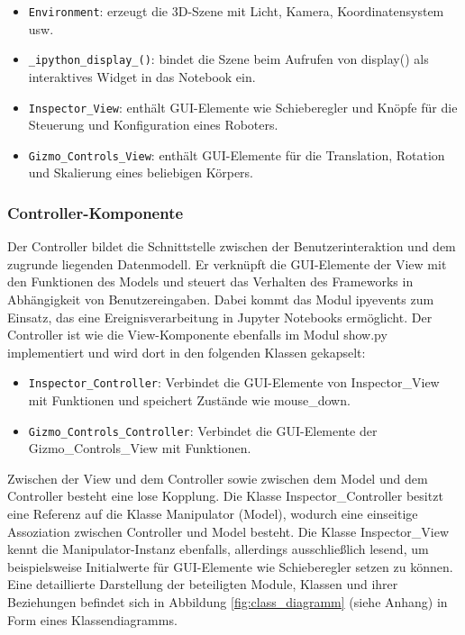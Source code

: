 \begin{itemize}
    \item \texttt{Environment}: erzeugt die 3D-Szene mit Licht, Kamera, Koordinatensystem usw.
    \item \texttt{\_ipython\_display\_()}: bindet die Szene beim Aufrufen von display() als interaktives Widget in das Notebook ein.
    \item \texttt{Inspector\_View}: enthält GUI-Elemente wie Schieberegler und Knöpfe für die Steuerung und Konfiguration eines Roboters.
    \item \texttt{Gizmo\_Controls\_View}: enthält GUI-Elemente für die Translation, Rotation und Skalierung eines beliebigen Körpers.
\end{itemize}

\subsubsection{Controller-Komponente}
Der Controller bildet die Schnittstelle zwischen der Benutzerinteraktion und dem zugrunde liegenden Datenmodell.
Er verknüpft die GUI-Elemente der View mit den Funktionen des Models und steuert das Verhalten des Frameworks in Abhängigkeit von Benutzereingaben.
Dabei kommt das Modul ipyevents zum Einsatz, das eine Ereignisverarbeitung in Jupyter Notebooks ermöglicht.
Der Controller ist wie die View-Komponente ebenfalls im Modul show.py implementiert und wird dort in den folgenden Klassen gekapselt:

\begin{itemize}
    \item \texttt{Inspector\_Controller}: Verbindet die GUI-Elemente von Inspector\_View mit Funktionen und speichert Zustände wie mouse\_down.
    \item \texttt{Gizmo\_Controls\_Controller}: Verbindet die GUI-Elemente der \\Giz\-mo\_Con\-trols\_View mit Funktionen.
\end{itemize}

Zwischen der View und dem Controller sowie zwischen dem Model und dem Controller besteht eine lose Kopplung.
Die Klasse Inspector\_Controller besitzt eine Referenz auf die Klasse Manipulator (Model), wodurch eine einseitige Assoziation zwischen Controller und Model besteht.
Die Klasse Inspector\_View kennt die Manipulator-Instanz ebenfalls, allerdings ausschließlich lesend, um beispielsweise Initialwerte für GUI-Elemente wie Schieberegler setzen zu können.
Eine detaillierte Darstellung der beteiligten Module, Klassen und ihrer Beziehungen befindet sich in Abbildung \ref{fig:class_diagramm} (siehe Anhang) in Form eines Klassendiagramms.


